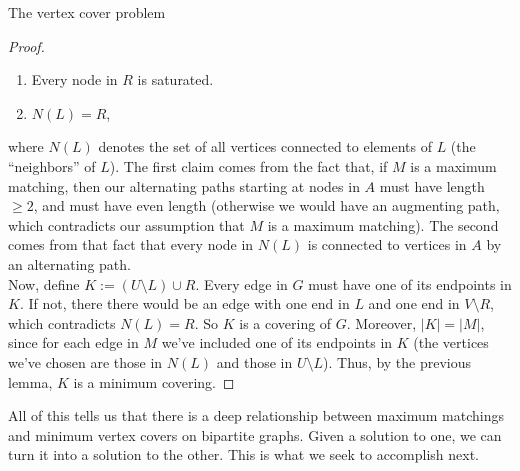 \documentclass[11pt]{article}
\renewcommand{\'}{^{'}}
\begin{document}
\begin{section}{The vertex cover problem}
\begin{proof}
		\begin{enumerate}
			\item Every node in $R$ is saturated.
			\item $N(L) = R$,
		\end{enumerate}
		where $N(L)$ denotes the set of all vertices connected to elements of $L$ (the 
		``neighbors'' of $L$). The first claim comes from the fact that, if $M$ is a 
		maximum matching, then our alternating paths starting at nodes in $A$ must have 
		length $\geq 2$, and must have even length (otherwise we would have an augmenting path, 
		which contradicts our assumption that $M$ is a maximum matching).
		The second comes from that fact that every node in $N(L)$ is connected to vertices in 
		$A$ by an alternating path. \\
		Now, define $K := (U\setminus L)\cup R$. Every edge 
		in $G$ must have one of its endpoints in $K$. If not, there there would be an 
		edge with one end in $L$ and one end in $V\setminus R$, which contradicts 
		$N(L) = R$. So $K$ is a covering of $G$. Moreover, $|K| = |M|$, since for each 
		edge in $M$ we've included one of its endpoints in $K$ (the vertices we've chosen are 
		those in $N(L)$ and those in $U\setminus L$). Thus, by the previous lemma, $K$ is 
		a minimum covering.
	\end{proof}
	All of this tells us that there is a deep relationship between maximum matchings and 
	minimum vertex covers on bipartite graphs. Given a solution to one, we can turn it into a 
	solution to the other. This is what we seek to accomplish next. 
\end{section}
\end{document}
